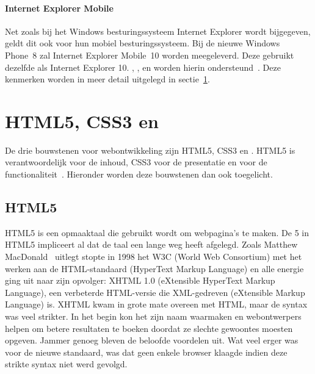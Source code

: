 \paragraph{Internet Explorer Mobile}
Net zoals bij het Windows besturingssysteem Internet Explorer wordt bijgegeven, geldt dit ook voor hun mobiel besturingssysteem. 
Bij de nieuwe Windows Phone~8 zal Internet Explorer Mobile~10 worden meegeleverd. 
Deze gebruikt dezelfde  als Internet Explorer 10. 
, ,  en  worden hierin ondersteund~\cite{Hales2012}.
Deze kenmerken worden in meer detail uitgelegd in sectie~\ref{sec:html5-css3-js}.



\section{HTML5, CSS3 en \js}
\label{sec:html5-css3-js}
De drie bouwstenen voor webontwikkeling zijn HTML5, CSS3 en \js{}. 
HTML5 is verantwoordelijk voor de inhoud, CSS3 voor de presentatie en \js{} voor de functionaliteit~\cite{PhilDutson2012}. 
Hieronder worden deze bouwstenen dan ook toegelicht.

\subsection{HTML5}
\label{sec:html5}
HTML5 is een opmaaktaal die gebruikt wordt om webpagina's te maken.
De 5 in HTML5 impliceert al dat de taal een lange weg heeft afgelegd.
Zoals Matthew MacDonald~\cite{MacDonald2011} uitlegt stopte in 1998 het W3C (World Web Consortium) met het werken aan de HTML-standaard (HyperText Markup Language) en alle energie ging uit naar zijn opvolger: XHTML 1.0 (eXtensible HyperText Markup Language), een verbeterde HTML-versie die XML-gedreven (eXtensible Markup Language) is. 
XHTML kwam in grote mate overeen met HTML, maar de syntax was veel strikter. 
In het begin kon het zijn naam waarmaken en webontwerpers helpen om betere resultaten te boeken doordat ze slechte gewoontes moesten opgeven. 
Jammer genoeg bleven de beloofde voordelen uit. 
Wat veel erger was voor de nieuwe standaard, was dat geen enkele browser klaagde indien deze strikte syntax niet werd gevolgd.

